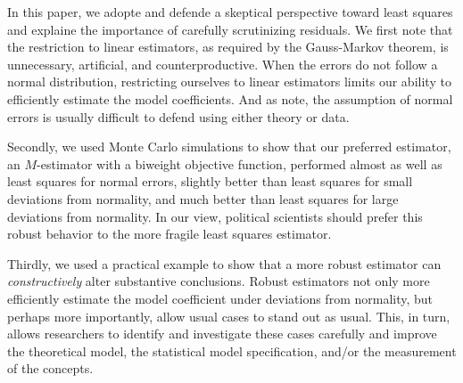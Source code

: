 \documentclass[12pt]{article}
\begin{document}
In this paper, we adopte and defende a skeptical perspective toward least squares and explaine the importance of carefully scrutinizing residuals.
We first note that the restriction to linear estimators, as required by the Gauss-Markov theorem, is unnecessary, artificial, and counterproductive. 
When the errors do not follow a normal distribution, restricting ourselves to linear estimators limits our ability to efficiently estimate the model coefficients. And as \cite{BerryFeldman1985} note, the assumption of normal errors is usually difficult to defend using either theory or data. 

Secondly, we used Monte Carlo simulations to show that our preferred estimator, an $M$-estimator with a biweight objective function, performed almost as well as least squares for normal errors, slightly better than least squares for small deviations from normality, and much better than least squares for large deviations from normality. 
In our view, political scientists should prefer this robust behavior to the more fragile least squares estimator.

Thirdly, we used a practical example to show that a more robust estimator can \textit{constructively} alter substantive conclusions. 
Robust estimators not only more efficiently estimate the model coefficient under deviations from normality, but perhaps more importantly, allow usual cases to stand out as usual. 
This, in turn, allows researchers to identify and investigate these cases carefully and improve the theoretical model, the statistical model specification, and/or the measurement of the concepts.

\singlespace


\end{document}
